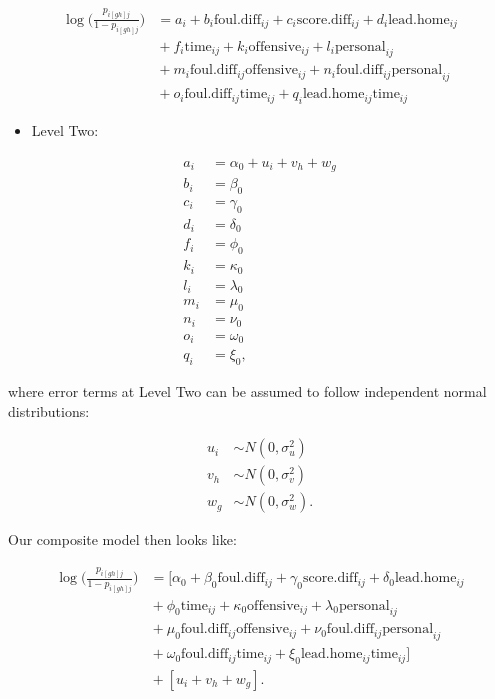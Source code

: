 \documentclass[
]{krantz}
\providecommand{\tightlist}{%
  \setlength{\itemsep}{0pt}\setlength{\parskip}{0pt}}
\begin{document}
\begin{align*}
\log\bigg(\frac{p_{i[gh]j}}{1-p_{i[gh]j}}\bigg) & = a_{i} + b_{i}\mathrm{foul.diff}_{ij} + c_{i}\mathrm{score.diff}_{ij} + d_{i}\mathrm{lead.home}_{ij} \\ 
 &{} + f_{i}\mathrm{time}_{ij} + k_{i}\mathrm{offensive}_{ij} + l_{i}\mathrm{personal}_{ij} \\ 
 &{} + m_{i}\mathrm{foul.diff}_{ij}\mathrm{offensive}_{ij} + n_{i}\mathrm{foul.diff}_{ij}\mathrm{personal}_{ij} \\ 
 &{} + o_{i}\mathrm{foul.diff}_{ij}\mathrm{time}_{ij} + q_{i}\mathrm{lead.home}_{ij}\mathrm{time}_{ij}
\end{align*}

\begin{itemize}
\tightlist
\item
  Level Two:
\end{itemize}

\begin{align*}
a_{i} & = \alpha_{0}+u_{i}+v_{h}+w_{g} \\
b_{i} & = \beta_{0} \\
c_{i} & = \gamma_{0} \\
d_{i} & = \delta_{0} \\
f_{i} & = \phi_{0} \\
k_{i} & = \kappa_{0} \\
l_{i} & = \lambda_{0} \\
m_{i} & = \mu_{0} \\
n_{i} & = \nu_{0} \\
o_{i} & = \omega_{0} \\
q_{i} & = \xi_{0},
\end{align*}

where error terms at Level Two can be assumed to follow independent normal distributions:

\begin{align*}
u_{i} & \sim N \left( 0 , \sigma_{u}^{2} \right) \\
v_{h} & \sim N \left( 0 , \sigma_{v}^{2} \right) \\
w_{g} & \sim N \left( 0 , \sigma_{w}^{2} \right).
\end{align*}

Our composite model then looks like:

\begin{align*}
\log\bigg(\frac{p_{i[gh]j}}{1-p_{i[gh]j}}\bigg) & = [\alpha_{0} + \beta_{0}\mathrm{foul.diff}_{ij} + \gamma_{0}\mathrm{score.diff}_{ij} + \delta_{0}\mathrm{lead.home}_{ij} \\ 
 &{} + \phi_{0}\mathrm{time}_{ij} + \kappa_{0}\mathrm{offensive}_{ij} + \lambda_{0}\mathrm{personal}_{ij} \\ 
 &{} + \mu_{0}\mathrm{foul.diff}_{ij}\mathrm{offensive}_{ij} + \nu_{0}\mathrm{foul.diff}_{ij}\mathrm{personal}_{ij} \\ 
 &{} + \omega_{0}\mathrm{foul.diff}_{ij}\mathrm{time}_{ij} + \xi_{0}\mathrm{lead.home}_{ij}\mathrm{time}_{ij}] \\ 
 &{} + [u_{i}+v_{h}+w_{g}].
\end{align*}
\end{document}
